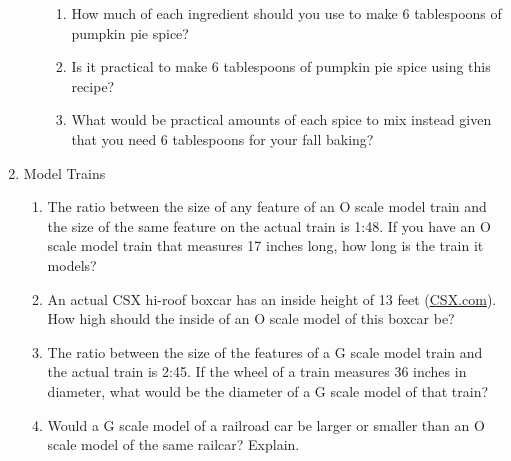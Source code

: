 \begin{enumerate}
\begin{enumerate}
\begin{enumerate}
\item How much of each ingredient should you use to make 6 tablespoons of pumpkin pie spice? 
\item Is it practical to make 6 tablespoons of pumpkin pie spice using this recipe? 
\item What would be practical amounts of each spice to mix instead given that you need 6 tablespoons for your fall baking? 
\end{enumerate}
\end{enumerate}

\item Model Trains
\begin{enumerate}
\item The ratio between the size of any feature of an O scale model train and the size of the same feature on the actual train is 1:48. If you have an O scale model train that measures 17 inches long, how long is the train it models?\wbvfill
\item An actual CSX hi-roof boxcar has an inside height of 13 feet (\href{https://www.csx.com/index.cfm/customers/resources/equipment/railroad-equipment/}{CSX.com}). How high should the inside of an O scale model of this boxcar be?\wbvfill
\item The ratio between the size of the features of a G scale model train and the actual train is 2:45. If the wheel of a train measures 36 inches in diameter, what would be the diameter of a G scale model of that train?\wbvfill
\item Would a G scale model of a railroad car be larger or smaller than an O scale model of the same railcar? Explain. 
\end{enumerate}



\end{enumerate}

